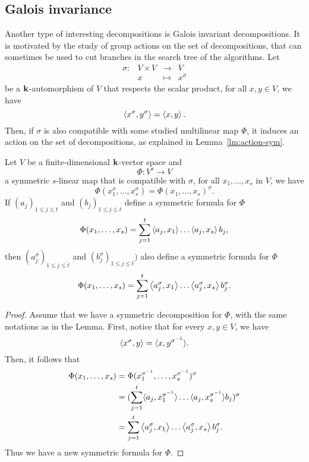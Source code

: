 \subsection{Galois invariance}

Another type of interesting decompositions is Galois invariant decompositions.
It is motivated by the study of group actions on the set of decompositions, that
can sometimes be used to cut branches in the search tree of the algorithms.
%
Let 
\[
 \begin{array}{cccc}
   \sigma: & V\times V &\to&V\\
 &x&\mapsto&x^\sigma
 \end{array}
\]
be a $\mathbf{k}$-automorphism of $V$ that respects the scalar product, \ie for all $x,
y\in V$, we have
\[
  \left\langle x^\sigma,y^\sigma\right\rangle = \left\langle x,y\right\rangle.
\]
Then, if $\sigma$ is also compatible with some studied multilinear map $\Phi$, it induces
an action on the set of decompositions, as explained in
Lemma~\ref{lm:action-sym}.
\begin{lm}
  \label{lm:action-sym}
  Let $V$ be a finite-dimensional $\mathbf{k}$-vector space and
  \[
    \Phi:V^s\to V
  \]
  a symmetric $s$-linear map that is compatible with $\sigma$, \ie for all $x_1,
  \dots, x_s$ in $V$, we have
  \[
    \Phi(x_1^\sigma, \dots, x_s^\sigma) = \Phi(x_1, \dots, x_s)^\sigma.
  \]
  If $(a_j)_{1\leq j \leq t}$ and $(b_j)_{1\leq j \leq t}$ define a symmetric
  formula for $\Phi$
  \[
    \Phi(x_1, \dots, x_s) = \sum_{j=1}^t\left\langle a_j,x_1\right\rangle\dots\left\langle a_j,x_s\right\rangle b_j,
  \]
  then $(a_j^\sigma)_{1\leq j\leq t}$ and $(b_{j}^\sigma)_{1\leq j\leq t})$ also
  define a symmetric formula for $\Phi$
  \[
    \Phi(x_1, \dots, x_s) =
    \sum_{j=1}^t\left\langle a_j^\sigma,x_1\right\rangle\dots\left\langle a_j^\sigma,x_s\right\rangle b_j^\sigma.
  \]
\end{lm}
\begin{proof}
 Assume that we have a symmetric decomposition for $\Phi$, with the same
 notations as in the Lemma. First, notice that for every $x,y\in V$, we have
 \[
   \left\langle x^\sigma,y\right\rangle = \langle{x},{y^{\sigma^{-1}}}\rangle.
 \]
 Then, it follows that
 \begin{align*}
   \Phi(x_1, \dots, x_s) &= \Phi(x_1^{\sigma^{-1}}, \dots,
   x_{s}^{\sigma^{-1}})^\sigma\\
   &=
   (\sum_{j=1}^t\langle{a_j},{x_1^{\sigma^{-1}}}\rangle\dots\langle{a_j},{x_s^{\sigma^{-1}}}\rangle
   b_j)^\sigma\\
   &= \sum_{j=1}^t\left\langle a_j^{\sigma},x_1\right\rangle\dots\left\langle a_j^\sigma,x_s\right\rangle b_j^\sigma.
 \end{align*}
 Thus we have a new symmetric formula for $\Phi$.
\end{proof}
